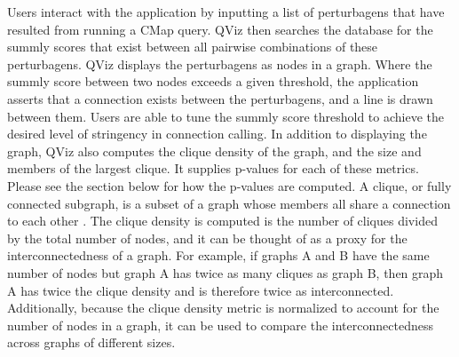 \documentclass[12pt]{article}
\begin{document}
Users interact with the application by inputting a list of perturbagens that have resulted from running a CMap query. QViz then searches the database for the summly scores that exist between all pairwise combinations of these perturbagens. QViz displays the perturbagens as nodes in a graph. Where the summly score between two nodes exceeds a given threshold, the application asserts that a connection exists between the perturbagens, and a line is drawn between them. Users are able to tune the summly score threshold to achieve the desired level of stringency in connection calling. In addition to displaying the graph, QViz also computes the clique density of the graph, and the size and members of the largest clique. It supplies p-values for each of these metrics. Please see the section below for how the p-values are computed. A clique, or fully connected subgraph, is a subset of a graph whose members all share a connection to each other \cite{luce_method_1949}. The clique density is computed is the number of cliques divided by the total number of nodes, and it can be thought of as a proxy for the interconnectedness of a graph. For example, if graphs A and B have the same number of nodes but graph A has twice as many cliques as graph B, then graph A has twice the clique density and is therefore twice as interconnected. Additionally, because the clique density metric is normalized to account for the number of nodes in a graph, it can be used to compare the interconnectedness across graphs of different sizes. 
\end{document}
